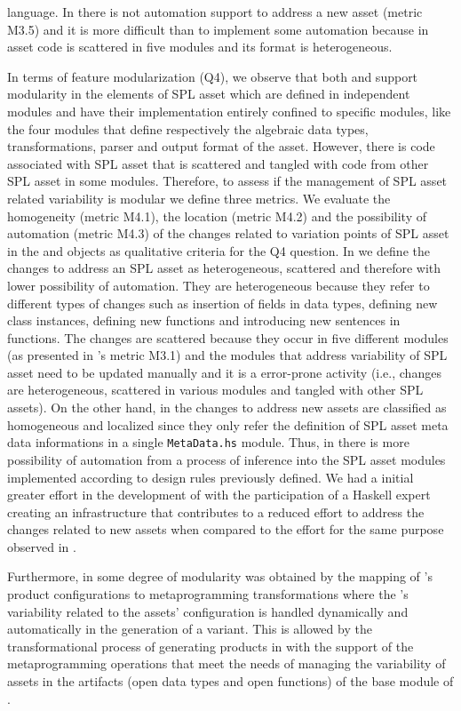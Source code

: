 language.  In \hp{} there is not automation support to address a new asset (metric M3.5) and it is more difficult than \hpl{} to implement some automation because in \hp{} asset code is scattered in five modules and its format is heterogeneous.

In terms of feature modularization (Q4), we observe that both \hpl{} and \hp{} support modularity in the elements of SPL asset which are defined in independent modules and have their implementation entirely confined to specific modules, like the four modules that define respectively the algebraic data types, transformations, parser and output format of the asset.  However, there is code associated with SPL asset that is scattered and tangled with code from other SPL asset in some modules. Therefore, to assess if the management of SPL asset related variability is modular we define three metrics.  We evaluate the homogeneity (metric M4.1), the location (metric M4.2) and the possibility of automation (metric M4.3) of the changes related to variation points of SPL asset in the \hpl{} and \hp{} objects as qualitative criteria for the Q4 question.  In \hp{} we define the changes to address an SPL asset as heterogeneous, scattered and therefore with lower possibility of automation. They are heterogeneous because they refer to different types of changes such as insertion of fields in data types, defining new class instances, defining new functions and introducing new sentences in functions. The changes are scattered because they occur in five different \hp{} modules (as presented in \hp{}'s metric M3.1) and the \hp{} modules that address variability of SPL asset need to be updated manually and it is a error-prone activity (i.e., changes are heterogeneous, scattered in various modules and tangled with other SPL assets).  On the other hand, in \hpl{} the changes to address new assets are classified as homogeneous and localized since they only refer the definition of SPL asset meta data informations in a single \texttt{MetaData.hs} module. Thus, in \hpl{} there is more possibility of automation from a process of inference into the SPL asset modules implemented according to design rules previously defined.  We had a initial greater effort in the development of \hpl{} with the participation of a Haskell expert creating an infrastructure that contributes to a reduced effort to address the changes related to new assets when compared to the effort for the same purpose observed in \hp.

Furthermore, in \hpl{} some degree of modularity was obtained by the mapping of \hpl's product configurations to metaprogramming transformations where the \hpl's variability related to the assets' configuration is handled dynamically and automatically in the generation of a \hpl{} variant. This is allowed by the transformational process of generating products in \hpl{} with the support of the metaprogramming operations that meet the needs of managing the variability of assets in the artifacts (open data types and open functions) of the base module of \hpl.

